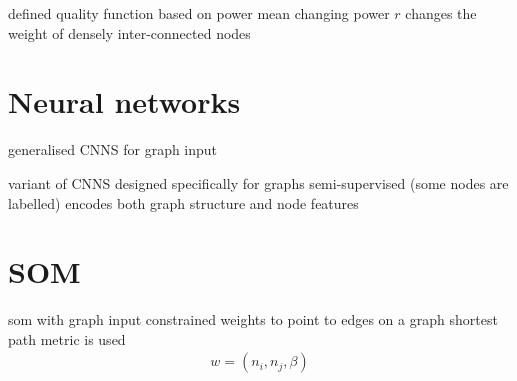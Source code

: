 \documentclass[•]{article}
\begin{document}
\cite{pizzuti2008ga}
defined quality function based on power mean
changing power $r$ changes the weight of densely inter-connected nodes

\section{Neural networks}

\cite{defferrard2016convolutional}
generalised CNNS for graph input


\cite{kipf2016semi}
variant of CNNS designed specifically for graphs
semi-supervised (some nodes are labelled)
encodes both graph structure and node features


\section{SOM}







\cite{yamakawa2006self}
som with graph input
constrained weights to point to edges on a graph
shortest path metric is used
\begin{align*}
w = (n_i, n_j, \beta)
\end{align*}




\end{document}
